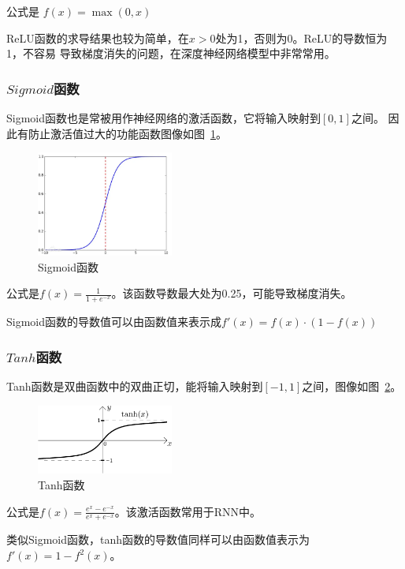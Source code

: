 \documentclass[a4paper,twoside,twocolumn]{article}
\begin{document}
\begin{spacing}{1.2}
公式是
$
f(x)=\max(0,x)
$

ReLU函数的求导结果也较为简单，在$x>0$处为1，否则为0。ReLU的导数恒为1，不容易
导致梯度消失的问题，在深度神经网络模型中非常常用。

\subsubsection{$Sigmoid$函数}

Sigmoid函数也是常被用作神经网络的激活函数，它将输入映射到$[0, 1]$之间。
因此有防止激活值过大的功能函数图像如图~\ref{fig:sigmoid}。

\begin{figure}[htb]
	\centering
	\caption{Sigmoid函数}
	\label{fig:sigmoid}
	\includegraphics[width=0.4\textwidth]{sigmoid.png}
\end{figure}

公式是$f(x)=\frac{1}{1+e^{-x}}$。该函数导数最大处为0.25，可能导致梯度消失。

Sigmoid函数的导数值可以由函数值来表示成$f'(x)=f(x)\cdot(1-f(x))$

\subsubsection{$Tanh$函数}

Tanh函数是双曲函数中的双曲正切，能将输入映射到$[-1, 1]$之间，图像如图~\ref{fig:tanh}。

\begin{figure}[htb]
	\centering
	\caption{Tanh函数}
	\label{fig:tanh}
	\includegraphics[width=0.4\textwidth]{tanh.png}
\end{figure}

公式是$f(x)=\frac{e^x-e^{-x}}{e^x+e^{-x}}$。该激活函数常用于RNN中。

类似Sigmoid函数，tanh函数的导数值同样可以由函数值表示为$f'(x)=1-f^2(x)$。



\end{spacing}
\end{document}
